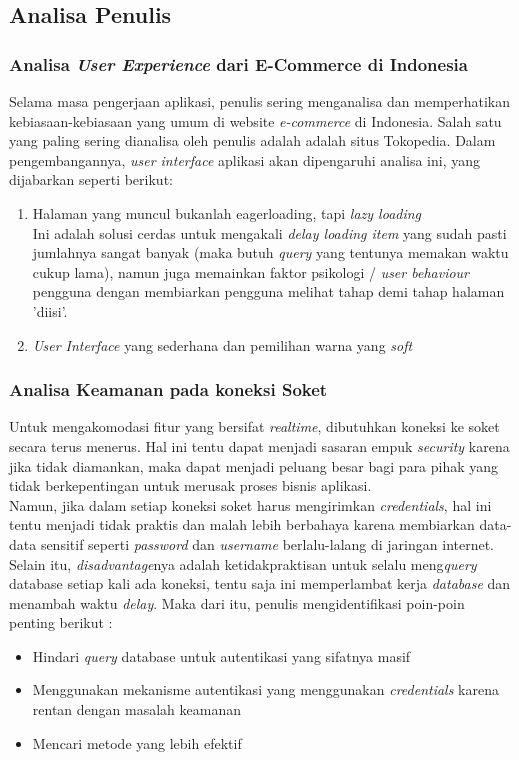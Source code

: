 
\subsection{Analisa Penulis}
	\subsubsection{Analisa \textit{User Experience} dari E-Commerce di Indonesia}
	\label{alasan-ux-ecommerce-indonesia alasan-app-serupa}
	Selama masa pengerjaan aplikasi, penulis sering menganalisa dan memperhatikan kebiasaan-kebiasaan yang umum di website \textit{e-commerce} di Indonesia. Salah satu yang paling sering dianalisa oleh penulis adalah adalah situs Tokopedia. Dalam pengembangannya, \textit{user interface} aplikasi akan dipengaruhi analisa ini, yang dijabarkan seperti berikut:
	\begin{enumerate}
		\item Halaman yang muncul bukanlah eagerloading, tapi \textit{lazy loading}\\
		\indent Ini adalah solusi cerdas untuk mengakali \textit{delay loading item} yang sudah pasti jumlahnya sangat banyak (maka butuh \textit{query} yang tentunya memakan waktu cukup lama), namun juga memainkan faktor psikologi / \textit{user behaviour} pengguna dengan membiarkan pengguna melihat tahap demi tahap halaman 'diisi'.
		\item \textit{User Interface} yang sederhana dan pemilihan warna yang \textit{soft}
	\end{enumerate}
	
	\subsubsection{Analisa Keamanan pada koneksi Soket}
	\label{alasan-socket.io}
	Untuk mengakomodasi fitur yang bersifat \textit{realtime}, dibutuhkan koneksi ke soket secara terus menerus. Hal ini tentu dapat menjadi sasaran empuk \textit{security} karena jika tidak diamankan, maka dapat menjadi peluang besar bagi para pihak yang tidak berkepentingan untuk merusak proses bisnis aplikasi.\\
	\indent Namun, jika dalam setiap koneksi soket harus mengirimkan \textit{credentials}, hal ini tentu menjadi tidak praktis dan malah lebih berbahaya karena membiarkan data-data sensitif seperti \textit{password} dan \textit{username} berlalu-lalang di jaringan internet. Selain itu, \textit{disadvantage}nya adalah ketidakpraktisan untuk selalu meng\textit{query} database setiap kali ada koneksi, tentu saja ini memperlambat kerja \textit{database} dan menambah waktu \textit{delay}. Maka dari itu, penulis mengidentifikasi poin-poin penting berikut :
		\begin{itemize}
			\item Hindari \textit{query} database untuk autentikasi yang sifatnya masif
			\item Menggunakan mekanisme autentikasi yang menggunakan \textit{credentials} karena rentan dengan masalah keamanan
			\item Mencari metode yang lebih efektif
		\end{itemize}
	
